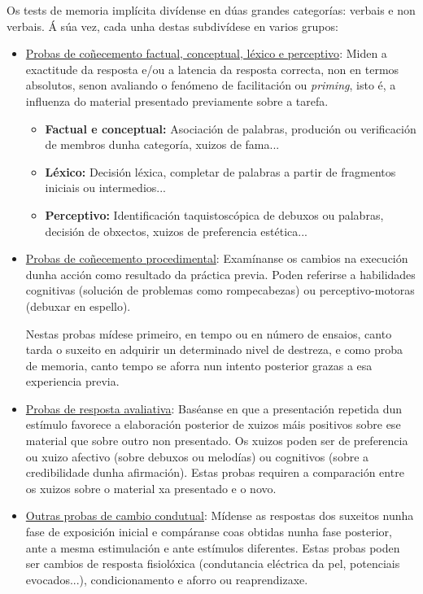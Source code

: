\documentclass[a4paper,11pt]{article}
\begin{document}
\begin{itemize}
	Os tests de memoria implícita divídense en dúas grandes categorías: verbais e non verbais. Á súa 
	vez, cada unha destas subdivídese en varios grupos: 
	\begin{itemize}
		\item \underline{Probas de coñecemento factual, conceptual, léxico e perceptivo}: Miden a 
		exactitude da resposta e/ou a latencia da resposta correcta, non en termos absolutos, senon 
		avaliando o fenómeno de facilitación ou \textit{priming}, isto é, a influenza do material 
		presentado previamente sobre a tarefa.
		\begin{itemize}
			\item \textbf{Factual e conceptual:} Asociación de palabras, produción ou verificación 
			de membros dunha categoría, xuizos de fama...
			\item \textbf{Léxico:} Decisión léxica, completar de palabras a partir de fragmentos 	
			iniciais ou intermedios...
			\item \textbf{Perceptivo:} Identificación taquistoscópica de debuxos ou palabras, 
			decisión de obxectos, xuizos de preferencia estética...
		\end{itemize}		 
		\item \underline{Probas de coñecemento procedimental}: Examínanse os cambios na execución 
		dunha acción como resultado da práctica previa. Poden referirse a habilidades cognitivas 
		(solución de problemas como rompecabezas) ou perceptivo-motoras (debuxar en espello). 
		
		Nestas probas mídese primeiro, en tempo ou en número de ensaios, canto tarda o suxeito en 
		adquirir un determinado nivel de destreza, e como proba de memoria, canto tempo se aforra 
		nun intento posterior grazas a esa experiencia previa.
		\item \underline{Probas de resposta avaliativa}: Baséanse en que a presentación repetida dun 
		estímulo favorece a elaboración posterior de xuizos máis positivos sobre ese material que 
		sobre outro non presentado. Os xuizos poden ser de preferencia ou xuizo afectivo (sobre 
		debuxos ou melodías) ou cognitivos (sobre a credibilidade dunha afirmación). Estas probas 
		requiren a comparación entre os xuizos sobre o material xa presentado e o novo.
		\item \underline{Outras probas de cambio condutual}: Mídense as respostas dos suxeitos nunha 
		fase de exposición inicial e compáranse coas obtidas nunha fase posterior, ante a mesma 
		estimulación e ante estímulos diferentes. Estas probas poden ser cambios de resposta 
		fisiolóxica (condutancia eléctrica da pel, potenciais evocados...), condicionamento e aforro 
		ou reaprendizaxe.
	\end{itemize}
\end{itemize}
\end{document}
